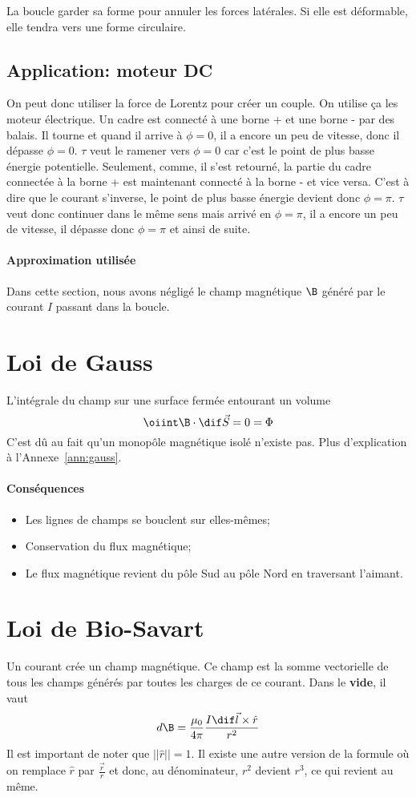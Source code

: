 La boucle garder sa forme pour annuler les forces latérales.
Si elle est déformable, elle tendra vers une forme circulaire.

\subsection{Application: moteur DC}
On peut donc utiliser la force de Lorentz pour créer un couple.
On utilise ça les moteur électrique.
Un cadre est connecté à une borne + et une borne - par des balais.
Il tourne et quand il arrive à $\phi = 0$, il a encore un peu de vitesse, donc il dépasse $\phi = 0$.
$\tau$ veut le ramener vers $\phi = 0$ car c'est le point de plus basse énergie potentielle.
Seulement, comme, il s'est retourné, la partie du cadre connectée à la borne + est maintenant connecté à la borne - et vice versa.
C'est à dire que le courant s'inverse, le point de plus basse énergie devient donc $\phi = \pi$.
$\tau$ veut donc continuer dans le même sens mais arrivé en $\phi = \pi$, il a encore un peu de vitesse, il dépasse donc $\phi = \pi$ et ainsi de suite.

\paragraph{Approximation utilisée}
Dans cette section, nous avons négligé le champ magnétique $\B$ généré par le courant $I$ passant dans la boucle.

\section{Loi de Gauss}
L'intégrale du champ sur une surface fermée entourant un volume
\[ \oiint \B \cdot \dif \vec S = 0 = \Phi \]
C'est dû au fait qu'un monopôle magnétique isolé n'existe pas.
Plus d'explication à l'Annexe~\ref{ann:gauss}.
\paragraph{Conséquences}
\begin{itemize}
	\item Les lignes de champs se bouclent sur elles-mêmes;
	\item Conservation du flux magnétique;
	\item Le flux magnétique revient du pôle Sud au pôle Nord en traversant l'aimant.
\end{itemize}

\section{Loi de Bio-Savart}
\label{sec:bs}
Un courant crée un champ magnétique.
Ce champ est la somme vectorielle de tous les champs générés par toutes les charges de ce courant.
Dans le \textbf{vide}, il vaut
\[ d\B = \frac{\mu_0}{4\pi}\frac{I\dif \vec l\times \hat r}{r^2} \]
Il est important de noter que $||\hat r|| = 1$.
Il existe une autre version de la formule où on remplace $\hat r$ par $\frac{\vec r}{r}$ et donc, au dénominateur, $r^2$ devient $r^3$, ce qui revient au même.


